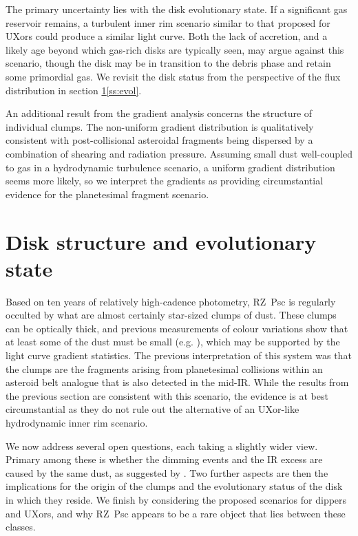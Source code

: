 \documentclass[]{rsos}
\begin{document}
The primary uncertainty lies with the disk evolutionary state. If a significant gas
reservoir remains, a turbulent inner rim scenario similar to that proposed for UXors
could produce a similar light curve. Both the lack of accretion, and a likely age beyond
which gas-rich disks are typically seen, may argue against this scenario, though the disk
may be in transition to the debris phase and retain some primordial gas. We revisit the
disk status from the perspective of the flux distribution in section
\ref{s:disk}\ref{ss:evol}.

An additional result from the gradient analysis concerns the structure of individual
clumps. The non-uniform gradient distribution is qualitatively consistent with
post-collisional asteroidal fragments being dispersed by a combination of shearing and
radiation pressure. Assuming small dust well-coupled to gas in a hydrodynamic turbulence
scenario, a uniform gradient distribution seems more likely, so we interpret the
gradients as providing circumstantial evidence for the planetesimal fragment scenario.

\section{Disk structure and evolutionary state}\label{s:disk}

Based on ten years of relatively high-cadence photometry, RZ~Psc is regularly occulted by
what are almost certainly star-sized clumps of dust. These clumps can be optically thick,
and previous measurements of colour variations show that at least some of the dust must
be small (e.g. \cite{2003ARep...47..580S}), which may be supported by the light curve
gradient statistics. The previous interpretation of this system was that the clumps are
the fragments arising from planetesimal collisions within an asteroid belt analogue that
is also detected in the mid-IR. While the results from the previous section are
consistent with this scenario, the evidence is at best circumstantial as they do not rule
out the alternative of an UXor-like hydrodynamic inner rim scenario.

We now address several open questions, each taking a slightly wider view. Primary among
these is whether the dimming events and the IR excess are caused by the same dust, as
suggested by \cite{2013A&A...553L...1D}. Two further aspects are then the implications
for the origin of the clumps and the evolutionary status of the disk in which they
reside. We finish by considering the proposed scenarios for dippers and UXors, and why
RZ~Psc appears to be a rare object that lies between these classes.
\end{document}
